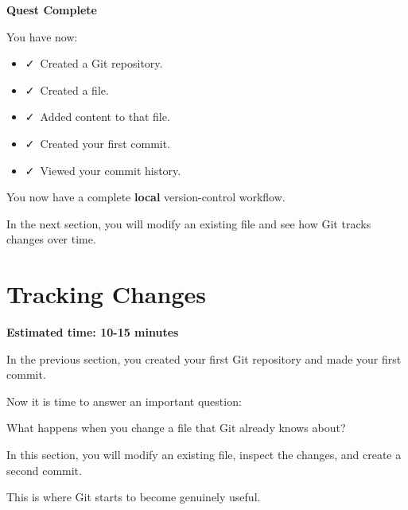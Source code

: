 \documentclass{csc2059practical}
\begin{document}
\begin{wrapupbox}
\textbf{Quest Complete}\par
\medskip

You have now:


\begin{itemize}
  \item \faCheck\ Created a Git repository.
\end{itemize}

\begin{itemize}
  \item \faCheck\ Created a file.
\end{itemize}

\begin{itemize}
  \item \faCheck\ Added content to that file.
\end{itemize}

\begin{itemize}
  \item \faCheck\ Created your first commit.
\end{itemize}

\begin{itemize}
  \item \faCheck\ Viewed your commit history.
\end{itemize}

You now have a complete \textbf{local} version-control workflow.


In the next section, you will modify an existing file and see how Git tracks changes over time.


\end{wrapupbox}

\clearpage
\section{Tracking Changes}
\begin{infobox}
\textbf{Estimated time: 10-15 minutes}
\end{infobox}
In the previous section, you created your first Git repository and made your first commit.

Now it is time to answer an important question:

What happens when you change a file that Git already knows about?

In this section, you will modify an existing file, inspect the changes, and create a second commit.

This is where Git starts to become genuinely useful.
\end{document}
